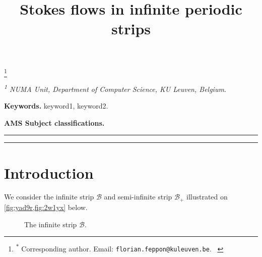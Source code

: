 \documentclass[a4paper,10pt,reqno]{amsart}
\begin{document}
\title{ Stokes flows in infinite periodic strips }
\author{}
\thanks{\hspace*{0.3em}\textsuperscript{$*$} Corresponding author. Email:
\texttt{florian.feppon@kuleuven.be}. \
\hspace*{\parindent}
}

\maketitle


\vspace{-2em}
\begin{center}
\emph{\textsuperscript{1} NUMA Unit, Department of Computer Science, KU Leuven,
    Belgium.}
\end{center}

\begin{abstract} 

\end{abstract} 
\medskip  
\noindent \textbf{Keywords.} keyword1, keyword2. 

\medskip
\noindent \textbf{AMS Subject classifications.}  \par
\medskip
\bigskip
\hrule
\tableofcontents
\vspace{-0.5cm}
\hrule
\medskip
\bigskip
\section{Introduction}
    
We consider the infinite strip $\mathcal{B}$ and semi-infinite strip $\mathcal{B}_+$ illustrated    
on \cref{fig:yad9r,fig:2w1yx} below.
\begin{figure}
    \centering  
    \caption{The infinite strip $\mathcal{B}$.}
    \label{fig:yad9r}
\end{figure}    
\end{document}

